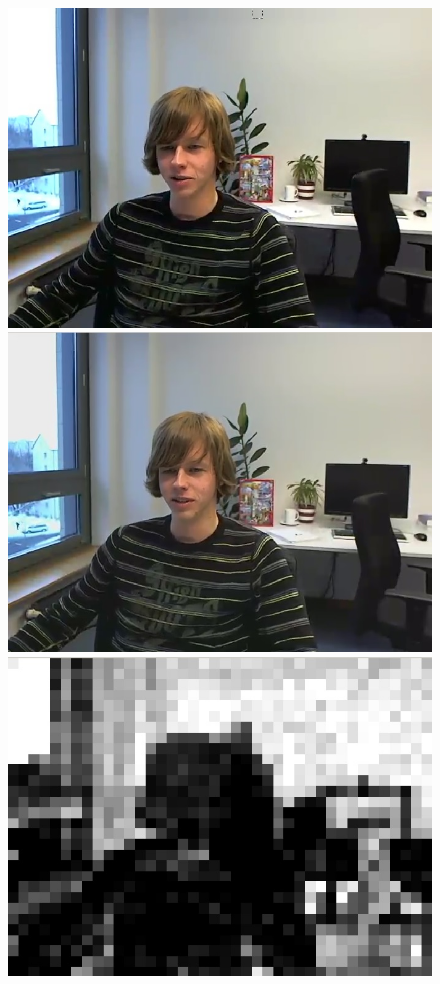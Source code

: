 \documentclass[11pt]{article} %
\begin{document}
\iffalse
\begin{figure}[!h]
    \centering
    \includegraphics[scale=0.4]{PaulDefault120_91250kbps}
    \includegraphics[scale=0.4]{QPOffset/paul120_250kbps_QPoffset4}
    \includegraphics[scale=0.4]{PaulDefault120_91250kbps_psnr}

\end{figure}
\end{document}
